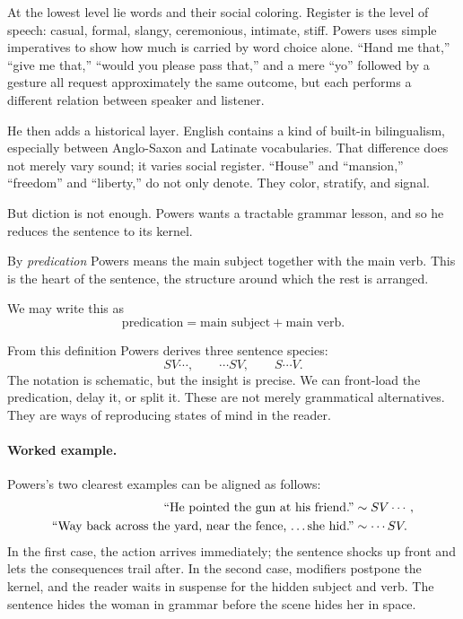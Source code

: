 At the lowest level lie words and their social coloring. Register is the level of speech: casual, formal, slangy, ceremonious, intimate, stiff. Powers uses simple imperatives to show how much is carried by word choice alone. ``Hand me that,'' ``give me that,'' ``would you please pass that,'' and a mere ``yo'' followed by a gesture all request approximately the same outcome, but each performs a different relation between speaker and listener.

He then adds a historical layer. English contains a kind of built-in bilingualism, especially between Anglo-Saxon and Latinate vocabularies. That difference does not merely vary sound; it varies social register. ``House'' and ``mansion,'' ``freedom'' and ``liberty,'' do not only denote. They color, stratify, and signal.

But diction is not enough. Powers wants a tractable grammar lesson, and so he reduces the sentence to its kernel.

\begin{definition}
By \emph{predication} Powers means the main subject together with the main verb. This is the heart of the sentence, the structure around which the rest is arranged.
\end{definition}

We may write this as
\begin{equation}
\text{predication} = \text{main subject} + \text{main verb}.
\end{equation}

From this definition Powers derives three sentence species:
\begin{equation}
SV\cdots,\qquad \cdots SV,\qquad S\cdots V.
\end{equation}
The notation is schematic, but the insight is precise. We can front-load the predication, delay it, or split it. These are not merely grammatical alternatives. They are ways of reproducing states of mind in the reader.

\paragraph{Worked example.} Powers's two clearest examples can be aligned as follows:
\begin{align}
\text{``He pointed the gun at his friend.''} &\sim SV\cdots,\\
\text{``Way back across the yard, near the fence, \dots she hid.''} &\sim \cdots SV.
\end{align}
In the first case, the action arrives immediately; the sentence shocks up front and lets the consequences trail after. In the second case, modifiers postpone the kernel, and the reader waits in suspense for the hidden subject and verb. The sentence hides the woman in grammar before the scene hides her in space.

